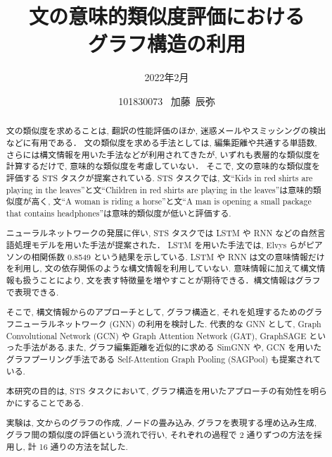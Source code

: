 \documentclass[a4paper,12pt,dvipdfmx]{thesis} %
\title{文の意味的類似度評価における\\グラフ構造の利用}
\author{2022年2月}
\date{101830073 \, 加藤~辰弥}
\begin{document}
\maketitle

\setcounter{tocdepth}{2}

\setlength{\baselineskip}{1.85zw}
\setlength{\textheight}{31\baselineskip}

\setlength{\baselineskip}{1.63zw}
\setlength{\textheight}{36\baselineskip}


\begin{abstract}
	\par 文の類似度を求めることは, 翻訳の性能評価のほか, 迷惑メールやスミッシングの検出などに有用である．
	文の類似度を求める手法としては, 編集距離や共通する単語数, さらには構文情報を用いた手法などが利用されてきたが, いずれも表層的な類似度を計算するだけで, 意味的な類似度を考慮していない．
	そこで, 文の意味的な類似度を評価する STS タスクが提案されている.
	STS タスクでは, 文``Kids in red shirts are playing in the leaves''と文``Children in red shirts are playing in the leaves''は意味的類似度が高く, 文``A woman is riding a horse''と文``A man is opening a small package that contains headphones''は意味的類似度が低いと評価する.
	\par
	ニューラルネットワークの発展に伴い, STS タスクでは LSTM や RNN などの自然言語処理モデルを用いた手法が提案された．
	LSTM を用いた手法では, Elvys らがピアソンの相関係数 0.8549 という結果を示している.
	LSTM や RNN は文の意味情報だけを利用し, 文の依存関係のような構文情報を利用していない.
	意味情報に加えて構文情報も扱うことにより, 文を表す特徴量を増やすことが期待できる．構文情報はグラフで表現できる.
	\par そこで, 構文情報からのアプローチとして, グラフ構造と, それを処理するためのグラフニューラルネットワーク (GNN) の利用を検討した.
	代表的な GNN として, Graph Convolutional Network (GCN) や Graph Attention Network (GAT), GraphSAGE といった手法がある.また, グラフ編集距離を近似的に求める SimGNN や, GCN を用いたグラフプーリング手法である Self-Attention Graph Pooling (SAGPool) も提案されている.
	\par 本研究の目的は, STS タスクにおいて, グラフ構造を用いたアプローチの有効性を明らかにすることである.
	\par 実験は, 文からのグラフの作成, ノードの畳み込み, グラフを表現する埋め込み生成, グラフ間の類似度の評価という流れで行い, それぞれの過程で 2 通りずつの方法を採用し, 計 16 通りの方法を試した.

\end{abstract}
\end{document}
